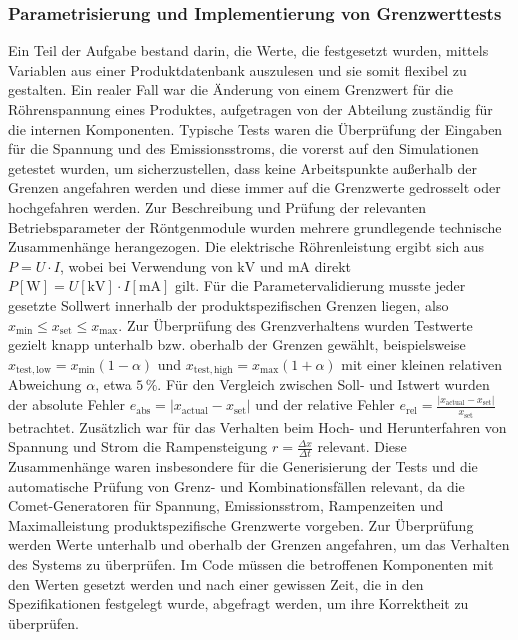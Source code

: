 \documentclass[12pt]{article} %
\begin{document}
\subsubsection{Parametrisierung und Implementierung von Grenzwerttests}
Ein Teil der Aufgabe bestand darin, die Werte, die festgesetzt wurden, mittels Variablen aus einer Produktdatenbank auszulesen und sie somit flexibel zu gestalten. Ein realer Fall war die Änderung von einem Grenzwert für die Röhrenspannung eines Produktes, aufgetragen von der Abteilung zuständig für die internen Komponenten.
Typische Tests waren die Überprüfung der Eingaben für die Spannung und des Emissionsstroms, die vorerst auf den Simulationen getestet wurden, um sicherzustellen, dass keine Arbeitspunkte außerhalb der Grenzen angefahren werden und diese immer auf die Grenzwerte gedrosselt oder hochgefahren werden.
Zur Beschreibung und Prüfung der relevanten Betriebsparameter der Röntgenmodule wurden mehrere grundlegende technische Zusammenhänge herangezogen. Die elektrische Röhrenleistung ergibt sich aus \(P = U \cdot I\), wobei bei Verwendung von \(\si{\kilo\volt}\) und \(\si{\milli\ampere}\) direkt \(P[\si{\watt}] = U[\si{\kilo\volt}] \cdot I[\si{\milli\ampere}]\) gilt.
Für die Parametervalidierung musste jeder gesetzte Sollwert innerhalb der produktspezifischen Grenzen liegen, also \(x_{\min} \leq x_{\mathrm{set}} \leq x_{\max}\). Zur Überprüfung des Grenzverhaltens wurden Testwerte gezielt knapp unterhalb bzw. oberhalb der Grenzen gewählt, beispielsweise \(x_{\mathrm{test,low}} = x_{\min}(1-\alpha)\) und \(x_{\mathrm{test,high}} = x_{\max}(1+\alpha)\) mit einer kleinen relativen Abweichung \(\alpha\), etwa \(5\,\%\).
Für den Vergleich zwischen Soll- und Istwert wurden der absolute Fehler \(e_{\mathrm{abs}} = |x_{\mathrm{actual}} - x_{\mathrm{set}}|\) und der relative Fehler \(e_{\mathrm{rel}} = \frac{|x_{\mathrm{actual}} - x_{\mathrm{set}}|}{x_{\mathrm{set}}}\) betrachtet.
Zusätzlich war für das Verhalten beim Hoch- und Herunterfahren von Spannung und Strom die Rampensteigung \(r = \frac{\Delta x}{\Delta t}\) relevant. Diese Zusammenhänge waren insbesondere für die Generisierung der Tests und die automatische Prüfung von Grenz- und Kombinationsfällen relevant, da die Comet-Generatoren für Spannung, Emissionsstrom, Rampenzeiten und Maximalleistung produktspezifische Grenzwerte vorgeben.
Zur Überprüfung werden Werte unterhalb und oberhalb der Grenzen angefahren, um das Verhalten des Systems zu überprüfen. Im Code müssen die betroffenen Komponenten mit den Werten gesetzt werden und nach einer gewissen Zeit, die in den Spezifikationen festgelegt wurde, abgefragt werden, um ihre Korrektheit zu überprüfen.
\end{document}
